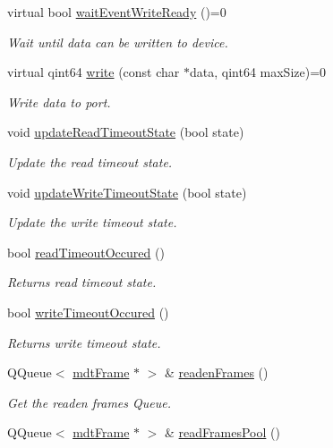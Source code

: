 \begin{DoxyCompactItemize}
virtual bool \hyperlink{classmdt_abstract_port_a7773bc21c63ce6a275f5a0889935ac83}{waitEventWriteReady} ()=0
\begin{DoxyCompactList}\small\item\em Wait until data can be written to device. \end{DoxyCompactList}\item 
virtual qint64 \hyperlink{classmdt_abstract_port_a64d4802975a76474b9196c91f57a6d90}{write} (const char $\ast$data, qint64 maxSize)=0
\begin{DoxyCompactList}\small\item\em Write data to port. \end{DoxyCompactList}\item 
void \hyperlink{classmdt_abstract_port_a0fc7317e988d5dea53a999cd1bf4faa9}{updateReadTimeoutState} (bool state)
\begin{DoxyCompactList}\small\item\em Update the read timeout state. \end{DoxyCompactList}\item 
void \hyperlink{classmdt_abstract_port_ab51135de1f7bbc4707c3284f924c98dc}{updateWriteTimeoutState} (bool state)
\begin{DoxyCompactList}\small\item\em Update the write timeout state. \end{DoxyCompactList}\item 
bool \hyperlink{classmdt_abstract_port_aec94143165e486cbbe6e0979be887c7e}{readTimeoutOccured} ()
\begin{DoxyCompactList}\small\item\em Returns read timeout state. \end{DoxyCompactList}\item 
bool \hyperlink{classmdt_abstract_port_a7c05a1abe77f0c3c334016c6ad866f67}{writeTimeoutOccured} ()
\begin{DoxyCompactList}\small\item\em Returns write timeout state. \end{DoxyCompactList}\item 
QQueue$<$ \hyperlink{classmdt_frame}{mdtFrame} $\ast$ $>$ \& \hyperlink{classmdt_abstract_port_a05356a33dc546a11d2794a0419d749e0}{readenFrames} ()
\begin{DoxyCompactList}\small\item\em Get the readen frames Queue. \end{DoxyCompactList}\item 
QQueue$<$ \hyperlink{classmdt_frame}{mdtFrame} $\ast$ $>$ \& \hyperlink{classmdt_abstract_port_a3850ab819a8fc5dad22af14b74c45274}{readFramesPool} ()

\end{DoxyCompactItemize}
